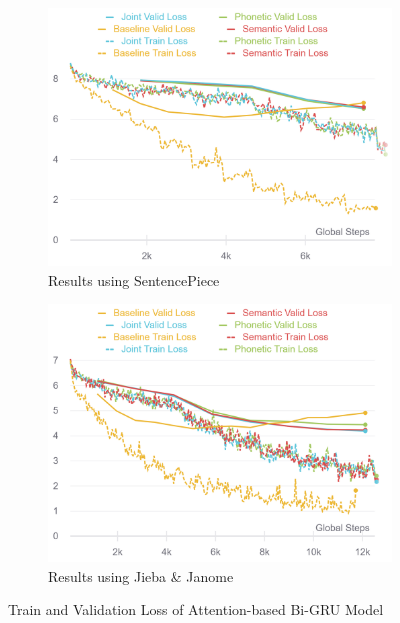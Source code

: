 \begin{figure}[t]
    \centering
    \begin{subfigure}[b]{0.495\textwidth}
        \centering
        \includegraphics[width=\textwidth]{../images/rnn_sp.png}
        \caption{Results using SentencePiece}
        \label{fig:seq2seq_loss_sp}
    \end{subfigure}
    \hfill
    \begin{subfigure}[b]{0.495\textwidth}
        \centering
        \includegraphics[width=\textwidth]{../images/rnn_jj.png}
        \caption{Results using Jieba \& Janome}
        \label{fig:seq2seq_loss_jj}
    \end{subfigure}
    \caption{Train and Validation Loss of Attention-based Bi-GRU Model}
	\label{fig:seq2seq_loss}
\end{figure}

